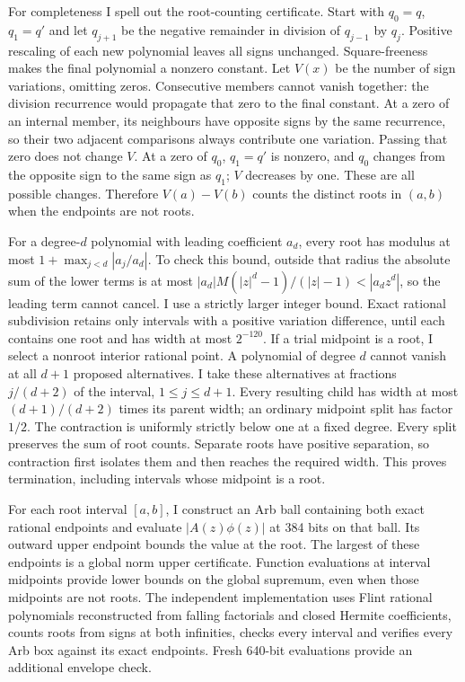 For completeness I spell out the root-counting certificate. Start with
$q_0=q$, $q_1=q'$ and let $q_{j+1}$ be the negative remainder in division
of $q_{j-1}$ by $q_j$. Positive rescaling of each new polynomial leaves
all signs unchanged. Square-freeness makes the final polynomial a nonzero
constant. Let $V(x)$ be the number of sign variations, omitting zeros.
Consecutive members cannot vanish together: the division recurrence would
propagate that zero to the final constant. At a zero of an internal member,
its neighbours have opposite signs by the same recurrence, so their two
adjacent comparisons always contribute one variation. Passing that zero
does not change $V$. At a zero of $q_0$, $q_1=q'$ is nonzero, and $q_0$
changes from the opposite sign to the same sign as $q_1$; $V$ decreases by
one. These are all possible changes. Therefore $V(a)-V(b)$ counts the
distinct roots in $(a,b)$ when the endpoints are not roots.

For a degree-$d$ polynomial with leading coefficient $a_d$, every root
has modulus at most $1+\max_{j<d}|a_j/a_d|$. To check this bound, outside
that radius the absolute sum of the lower terms is at most
$|a_d|M(|z|^d-1)/(|z|-1)<|a_d z^d|$, so the leading term cannot cancel.
I use a strictly larger integer bound. Exact rational subdivision retains
only intervals with a positive variation difference, until each contains
one root and has width at most $2^{-120}$. If a trial midpoint is a root,
I select a nonroot interior rational point. A polynomial of degree $d$
cannot vanish at all $d+1$ proposed alternatives. I take these alternatives
at fractions $j/(d+2)$ of the interval, $1\leq j\leq d+1$.
Every resulting child has width at most $(d+1)/(d+2)$ times its parent
width; an ordinary midpoint split has factor $1/2$. The contraction is
uniformly strictly below one at a fixed degree. Every split preserves
the sum of root counts. Separate roots have positive separation, so
contraction first isolates them and then reaches the required width.
This proves termination, including intervals whose midpoint is a root.

For each root interval $[a,b]$, I construct an Arb ball containing both
exact rational endpoints and evaluate $|A(z)\phi(z)|$ at 384 bits on that
ball. Its outward upper endpoint bounds the value at the root. The largest
of these endpoints is a global norm upper certificate. Function evaluations
at interval midpoints provide lower bounds on the global supremum, even
when those midpoints are not roots. The independent implementation uses
Flint rational polynomials reconstructed from falling factorials and closed
Hermite coefficients, counts roots from signs at both infinities, checks
every interval and verifies every Arb box against its exact endpoints.
Fresh 640-bit evaluations provide an additional envelope check.

